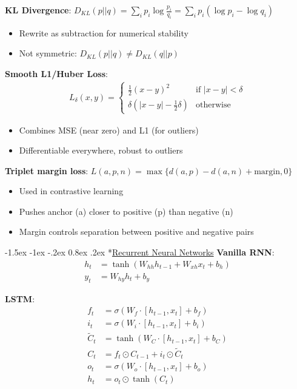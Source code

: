 \documentclass{article}
\makeatletter
\renewcommand\section{\@startsection{section}{1}{\z@}%
                                  {-1.5ex \@plus -1ex \@minus -.2ex}%
                                  {0.8ex \@plus.2ex}%
                                  {\normalfont\small\bfseries}}
\makeatother
\begin{document}
\begin{multicols}{3}
\textbf{KL Divergence}: $D_{KL}(p||q) = \sum_i p_i \log\frac{p_i}{q_i} = \sum_i p_i(\log p_i - \log q_i)$
\begin{itemize}
\item Rewrite as subtraction for numerical stability
\item Not symmetric: $D_{KL}(p||q) \neq D_{KL}(q||p)$
\end{itemize}

\textbf{Smooth L1/Huber Loss}:
\begin{align*}
L_{\delta}(x, y) = \begin{cases}
\frac{1}{2}(x-y)^2 & \text{if } |x-y| < \delta \\
\delta(|x-y| - \frac{1}{2}\delta) & \text{otherwise}
\end{cases}
\end{align*}
\begin{itemize}
\item Combines MSE (near zero) and L1 (for outliers)
\item Differentiable everywhere, robust to outliers
\end{itemize}

\textbf{Triplet margin loss}: $L(a,p,n) = \max\{d(a,p) - d(a,n) + \text{margin}, 0\}$
\begin{itemize}
\item Used in contrastive learning
\item Pushes anchor (a) closer to positive (p) than negative (n)
\item Margin controls separation between positive and negative pairs
\end{itemize}

\section*{\underline{Recurrent Neural Networks}}
\textbf{Vanilla RNN}:
\begin{align*}
h_t &= \tanh(W_{hh}h_{t-1} + W_{xh}x_t + b_h)\\
y_t &= W_{hy}h_t + b_y
\end{align*}

\textbf{LSTM}:
\begin{align*}
f_t &= \sigma(W_f \cdot [h_{t-1}, x_t] + b_f)\\
i_t &= \sigma(W_i \cdot [h_{t-1}, x_t] + b_i)\\
\tilde{C}_t &= \tanh(W_C \cdot [h_{t-1}, x_t] + b_C)\\
C_t &= f_t \odot C_{t-1} + i_t \odot \tilde{C}_t\\
o_t &= \sigma(W_o \cdot [h_{t-1}, x_t] + b_o)\\
h_t &= o_t \odot \tanh(C_t)
\end{align*}


\end{multicols}
\end{document}
